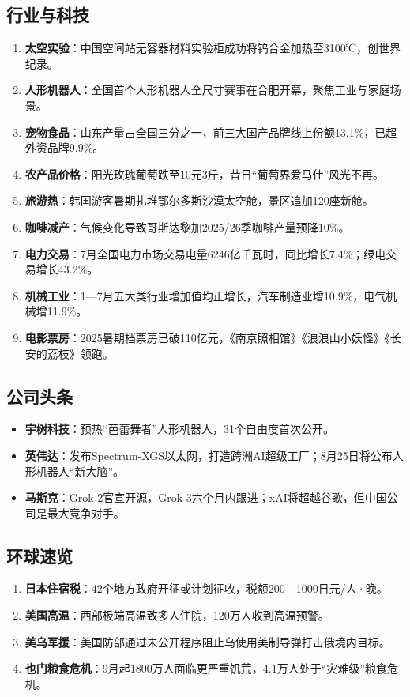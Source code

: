 \subsection{行业与科技}
\begin{enumerate}[leftmargin=*, nosep]
    \item \textbf{太空实验}：中国空间站无容器材料实验柜成功将钨合金加热至3100℃，创世界纪录。
    \item \textbf{人形机器人}：全国首个人形机器人全尺寸赛事在合肥开幕，聚焦工业与家庭场景。
    \item \textbf{宠物食品}：山东产量占全国三分之一，前三大国产品牌线上份额13.1\%，已超外资品牌9.9\%。
    \item \textbf{农产品价格}：阳光玫瑰葡萄跌至10元3斤，昔日“葡萄界爱马仕”风光不再。
    \item \textbf{旅游热}：韩国游客暑期扎堆鄂尔多斯沙漠太空舱，景区追加120座新舱。
    \item \textbf{咖啡减产}：气候变化导致哥斯达黎加2025/26季咖啡产量预降10\%。
    \item \textbf{电力交易}：7月全国电力市场交易电量6246亿千瓦时，同比增长7.4\%；绿电交易增长43.2\%。
    \item \textbf{机械工业}：1—7月五大类行业增加值均正增长，汽车制造业增10.9\%，电气机械增11.9\%。
    \item \textbf{电影票房}：2025暑期档票房已破110亿元，《南京照相馆》《浪浪山小妖怪》《长安的荔枝》领跑。
\end{enumerate}

\subsection{公司头条}
\begin{itemize}[leftmargin=*, nosep]
    \item \textbf{宇树科技}：预热“芭蕾舞者”人形机器人，31个自由度首次公开。
    \item \textbf{英伟达}：发布Spectrum-XGS以太网，打造跨洲AI超级工厂；8月25日将公布人形机器人“新大脑”。
    \item \textbf{马斯克}：Grok-2官宣开源，Grok-3六个月内跟进；xAI将超越谷歌，但中国公司是最大竞争对手。
\end{itemize}

\subsection{环球速览}
\begin{enumerate}[leftmargin=*, nosep]
    \item \textbf{日本住宿税}：42个地方政府开征或计划征收，税额200—1000日元/人·晚。
    \item \textbf{美国高温}：西部极端高温致多人住院，120万人收到高温预警。
    \item \textbf{美乌军援}：美国防部通过未公开程序阻止乌使用美制导弹打击俄境内目标。
    \item \textbf{也门粮食危机}：9月起1800万人面临更严重饥荒，4.1万人处于“灾难级”粮食危机。
\end{enumerate}


